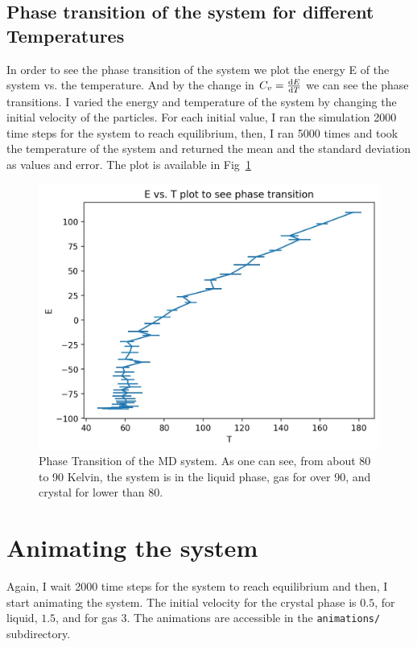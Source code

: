 \documentclass[12pt, a4paper]{article}
\begin{document}
	\subsection{Phase transition of the system for different Temperatures}
	In order to see the phase transition of the system we plot the energy E of the system vs. the temperature. And by the change in 
	$C_v = \derivative{E}{T}$ we can see the phase transitions. I varied the energy and temperature of the system by changing the initial velocity
	of the particles. For each initial value, I ran the simulation 2000 time steps for the system to reach equilibrium, then, I ran 5000 times and took
	the temperature of the system and returned the mean and the standard deviation as values and error. The plot is available in 
	Fig~\ref{fig:phase_transition}
	
	\begin{figure}[h!]
		\centering
		\includegraphics[width=0.9\linewidth]{../results/phase_transition.jpg}
		\caption{Phase Transition of the MD system. As one can see, from about 80 to 90 Kelvin, the system is in the liquid phase, gas for over 90,
		and crystal for lower than 80.}
		\label{fig:phase_transition}
	\end{figure}
	
	\section{Animating the system}
	Again, I wait 2000 time steps for the system to reach equilibrium and then, I start animating the system.
	The initial velocity for the crystal phase is $0.5$, for liquid, $1.5$, and for gas $3$. The animations are accessible in the \texttt{animations/}
	subdirectory.
\end{document}

